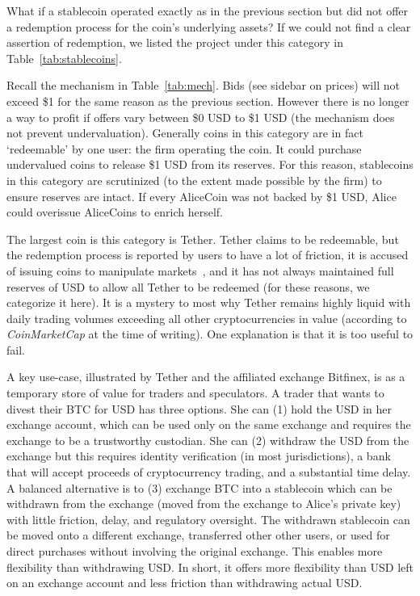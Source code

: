What if a stablecoin operated exactly as in the previous section but did not offer a redemption process for the coin's underlying assets? If we could not find a clear assertion of redemption, we listed the project under this category in Table~\ref{tab:stablecoins}.

Recall the mechanism in Table~\ref{tab:mech}. Bids (see sidebar on prices) will not exceed \$1 for the same reason as the previous section. However there is no longer a way to profit if offers vary between \$0 USD to \$1 USD (\ie the mechanism does not prevent undervaluation). Generally coins in this category are in fact `redeemable' by one user: the firm operating the coin. It could purchase undervalued coins to release \$1 USD from its reserves. For this reason, stablecoins in this category are scrutinized (to the extent made possible by the firm) to ensure reserves are intact. If every AliceCoin was not backed by \$1 USD, Alice could overissue AliceCoins to enrich herself.

The largest coin is this category is Tether. Tether claims to be redeemable, but the redemption process is reported by users to have a lot of friction, it is accused of issuing coins to manipulate markets~\cite{griffin2018bitcoin}, and it has not always maintained full reserves of USD to allow all Tether to be redeemed (for these reasons, we categorize it here). It is a mystery to most why Tether remains highly liquid with daily trading volumes exceeding all other cryptocurrencies in value (according to \textit{CoinMarketCap} at the time of writing). One explanation is that it is too useful to fail.

A key use-case, illustrated by Tether and the affiliated exchange Bitfinex, is as a temporary store of value for traders and speculators. A trader that wants to divest their BTC for USD has three options. She can (1) hold the USD in her exchange account, which can be used only on the same exchange and requires the exchange to be a trustworthy custodian. She can (2) withdraw the USD from the exchange but this requires identity verification (in most jurisdictions), a bank that will accept proceeds of cryptocurrency trading, and a substantial time delay. A balanced alternative is to (3) exchange BTC into a stablecoin which can be withdrawn from the exchange (\ie moved from the exchange to Alice's private key) with little friction, delay, and regulatory oversight. The withdrawn stablecoin can be moved onto a different exchange, transferred other other users, or used for direct purchases without involving the original exchange. This enables more flexibility than withdrawing USD. In short, it offers more flexibility than USD left on an exchange account and less friction than withdrawing actual USD.
 
